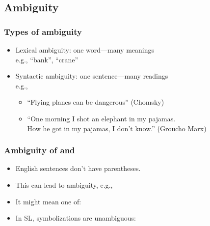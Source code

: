 \subsection{Ambiguity}

\begin{frame}
    \frametitle{Types of ambiguity}

\begin{itemize}
  \item Lexical ambiguity: one word---many meanings \\
  e.g., ``bank'', ``crane''
  \item Syntactic ambiguity: one sentence---many readings\\
  e.g.,
  \begin{itemize}
  \item ``Flying planes can be dangerous'' (Chomsky)
  \item ``One morning I shot an elephant in my pajamas.\\ How he got in my pajamas, I don't know.'' (Groucho Marx)
  \end{itemize}
\end{itemize}

\end{frame}

\begin{frame}
  \frametitle{Ambiguity of \eand{} and \eor}

  \begin{itemize}[<+->]
    \item English sentences don't have parentheses.
    \item This can lead to ambiguity, e.g.,
    \item It might mean one of:
    \item In SL, symbolizations are unambiguous:
  \end{itemize}
\end{frame}















